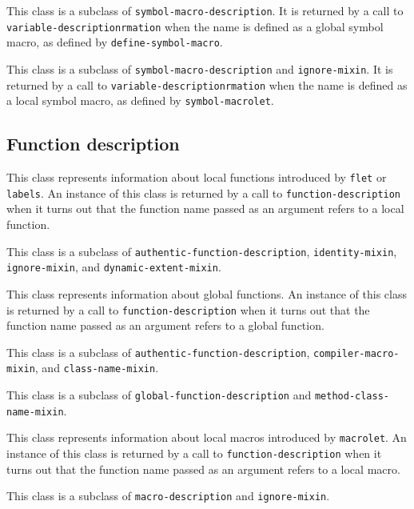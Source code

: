 This class is a subclass of \texttt{symbol-macro-description}.  It is
returned by a call to \texttt{variable-descriptionrmation} when the name is
defined as a global symbol macro, as defined by
\texttt{define-symbol-macro}.


This class is a subclass of \texttt{symbol-macro-description} and
\texttt{ignore-mixin}.  It is returned by a call to
\texttt{variable-descriptionrmation} when the name is defined as a local
symbol macro, as defined by \texttt{symbol-macrolet}.

\subsection{Function description}


This class represents information about local functions introduced by
\texttt{flet} or \texttt{labels}.  An instance of this class is
returned by a call to \texttt{function-description} when it turns out that
the function name passed as an argument refers to a local function.

This class is a subclass of \texttt{authentic-function-description},
\texttt{identity-mixin}, \texttt{ignore-mixin}, and \texttt{dynamic-extent-mixin}.


This class represents information about global functions.  An instance
of this class is returned by a call to \texttt{function-description} when it
turns out that the function name passed as an argument refers to a
global function.

This class is a subclass of \texttt{authentic-function-description},
\texttt{compiler-macro-mixin}, and \texttt{class-name-mixin}.


This class is a subclass of \texttt{global-function-description} and
\texttt{method-class-name-mixin}.



This class represents information about local macros introduced by
\texttt{macrolet}.  An instance of this class is returned by a call to
\texttt{function-description} when it turns out that the function name passed
as an argument refers to a local macro.

This class is a subclass of \texttt{macro-description} and \texttt{ignore-mixin}.

